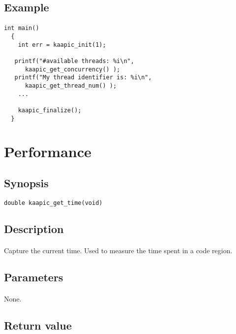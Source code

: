 \documentclass[a4paper, 11pt]{article}
\begin{document}
\subsection{Example}
\paragraph{}
\begin{small}
\begin{lstlisting}[frame=tb]
  int main()
  {
    int err = kaapic_init(1);

   printf("#available threads: %i\n", 
      kaapic_get_concurrency() );
   printf("My thread identifier is: %i\n", 
      kaapic_get_thread_num() );
    ...

    kaapic_finalize();
  }
\end{lstlisting}
\end{small}


\newpage
\section{Performance}

\subsection{Synopsis}
\begin{small}
\lstset{language=C}
\begin{lstlisting}[frame=tb]
double kaapic_get_time(void)
\end{lstlisting}
\end{small}

\subsection{Description}
\paragraph{}
Capture the current time. Used to measure the time spent in a code region.

\subsection{Parameters}
\paragraph{}
None.

\subsection{Return value}
\end{document}
